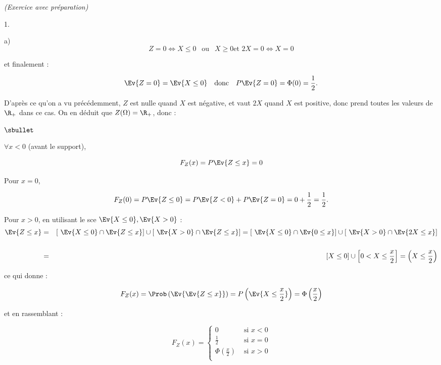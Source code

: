 \documentclass[11pt]{article}%
\begin{document}
\begin{exercice}{\it (Exercice avec préparation)}
\begin{noliste}{1.}
\begin{noliste}{a)}
\[
 Z = 0 \Longleftrightarrow X \leq 0 \ \ \text{ ou } \ \ X \geq 0 \text{
et } 2 X = 0 \Longleftrightarrow X = 0 
\]

 et finalement : 
 
\[
 \Ev{Z = 0 } = \Ev{X \leq 0 } \ \ \text{ donc } \ \ P \Ev{ Z = 0 } =
\Phi ( 0 ) = \frac{ 1 }{ 2 }. 
\]

 \item D'après ce qu'on a vu précédemment, $Z$ est nulle quand $X$ est
négative, et vaut $2X$ quand $X$ est positive, donc prend toutes les
valeurs de $\R_+ $ dans ce cas. On en déduit que $Z ( \Omega ) = \R_+
$, donc :
 \begin{noliste}{$\sbullet$}

 \item $ \forall x < 0 $ (avant le support), 
 
\[
 F_{Z} ( x ) = P \Ev{ Z \leq x } = 0 
\]

 \item Pour $x = 0$,
 
\[
 F_{Z} (0) = P \Ev{ Z \leq 0 } = P \Ev{ Z < 0 } + P \Ev{ Z = 0 } = 0 +
\frac{ 1 }{ 2 } = \frac{ 1 }{ 2 }. 
\]

 \item Pour $x > 0$, en utilisant le sce $\Ev{X \leq 0}, \Ev{X > 0}$ : 
 \begin{eqnarray*}
 \Ev{ Z \leq x } & = & [ \ \Ev{X \leq 0} \cap \Ev{Z \leq x } ] \cup [ \
\Ev{X > 0} \cap \Ev{Z \leq x } ] = [ \ \Ev{X \leq 0 } \cap \Ev{ 0 \leq
x } ] \cup [ \ \Ev{X > 0 } \cap \Ev{ 2 X \leq x } ] \\
\\
 & = & [ X \leq 0 ] \cup \left[ 0 < X \leq \frac{ x }{ 2 } \right] =
\left( X \leq \frac{ x }{ 2 } \right)
 \end{eqnarray*}

 ce qui donne : 
 
\[
 F_{Z} ( x ) = \Prob\left(\Ev{\Ev{ Z \leq x }}\right) = P \left(\Ev{ X
\leq \frac{ x }{ 2 }}\right) = \Phi \left( \frac{ x }{ 2 } \right) 
\]

 \end{noliste}

 et en rassemblant : 
 
\[
 F_{Z} ( x ) = \left\{\begin{array}{cl}
 0 & \text{ si } x < 0 \\
\frac{1}{2} & \text{ si } x = 0 \\
\Phi \left( \frac{ x }{ 2 } \right) & \text{ si } x > 0 \\
\end{array}
\right. 
\]



\end{noliste}
\end{noliste}
\end{exercice}
\end{document}
